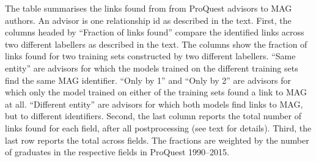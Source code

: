\begin{table}
\begin{threeparttable}
\begin{tablenotes}[para]
\item The table summarises the links found from from ProQuest advisors to MAG authors. An advisor is one relationship id as described in the text. First, the columns headed by ``Fraction of links found'' compare the identified links across two different labellers as described in the text. The columns show the fraction of links found for two training sets constructed by two different labellers. ``Same entity'' are advisors for which the models trained on the different training sets find the same MAG identifier. ``Only by 1'' and ``Only by 2'' are advisors for which only the model trained on either of the training sets found a link to MAG at all. ``Different entity'' are advisors for which both models find links to MAG, but to different identifiers. Second, the last column reports the total number of links found for each field, after all postprocessing (see text for details). Third, the last row reports the total across fields. The fractions are weighted by the number of graduates in the respective fields in ProQuest 1990--2015.
\end{tablenotes}
\end{threeparttable}
\end{table}
